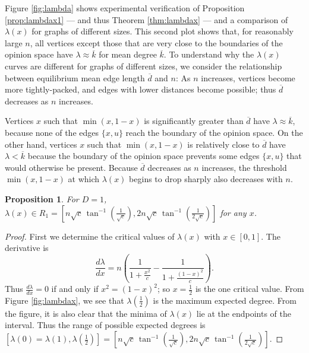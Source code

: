 \documentclass[a4paper,10pt]{article}
\newtheorem{prop}{Proposition}
\begin{document}
Figure \ref{fig:lambda} shows experimental verification of Proposition \ref{prop:lambdax1} --- and thus Theorem \ref{thm:lambdax} --- and a comparison of $\lambda(x)$ for graphs of different sizes. This second plot shows that, for reasonably large $n$, all vertices except those that are very close to the boundaries of the opinion space have $\lambda \approx \overline{k}$ for mean degree $\overline{k}$. To understand why the $\lambda(x)$ curves are different for graphs of different sizes, we consider the relationship between equilibrium mean edge length $\overline{d}$ and $n$: As $n$ increases, vertices become more tightly-packed, and edges with lower distances become possible; thus $\overline{d}$ decreases as $n$ increases. 

Vertices $x$ such that $\min(x, 1 - x)$ is significantly greater than $\overline{d}$ have $\lambda \approx \overline{k}$, because none of the edges $\{x, u\}$ reach the boundary of the opinion space. On the other hand, vertices $x$ such that $\min(x, 1 - x)$ is relatively close to $\overline{d}$ have $\lambda < \overline{k}$ because the boundary of the opinion space prevents some edges $\{x, u\}$ that would otherwise be present. Because $\overline{d}$ decreases as $n$ increases, the threshold $\min(x, 1 - x)$ at which $\lambda(x)$ begins to drop sharply also decreases with $n$.

\begin{prop}
\label{prop:R1}
 For $D=1$, $\lambda(x) \in R_1 = \left[n \sqrt{c}\, \tan^{-1}\left(\frac{1}{\sqrt{c}}\right),2 n\sqrt{c}\,  \tan^{-1}\left(\frac{1}{2 \sqrt{c}}\right)\right]$ for any $x$.
 \end{prop}
\begin{proof}
First we determine the critical values of $\lambda(x)$ with $x \in [0, 1]$. The derivative is
\begin{equation}
 \frac{d\lambda}{dx} = n\left(\frac{1}{1+\frac{x^2}{c}} - \frac{1}{1+\frac{(1-x)^2}{c}} \right).
\end{equation}
Thus $\frac{d\lambda}{dx} = 0$ if and only if $x^2 = (1 - x)^2$; so $x=\frac{1}{2}$ is the one critical value. From Figure \ref{fig:lambdax}, we see that $\lambda(\frac{1}{2})$ is the maximum expected degree. From the figure, it is also clear that the minima of $\lambda(x)$ lie at the endpoints of the interval. Thus the range of possible expected degrees is 
$[\lambda(0)=\lambda(1), \lambda(\frac{1}{2})] = \left[n \sqrt{c}\, \tan^{-1}\left(\frac{1}{\sqrt{c}}\right),2 n\sqrt{c}\,  \tan^{-1}\left(\frac{1}{2 \sqrt{c}}\right)\right]$. 
\end{proof}
\end{document}
